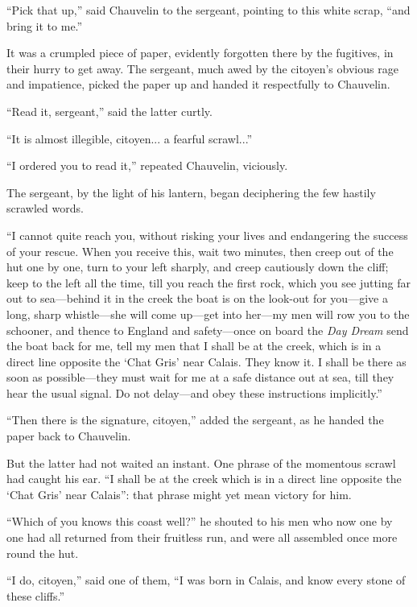 \documentclass[paper=5.5in:8.5in,BCOR=7mm,twoside,DIV=calc,12pt,usegeometry,chapterprefix,endperiod,headings=big]{scrbook}
\begin{document}
\enquote{Pick that up,} said Chauvelin to the sergeant, pointing to this white scrap, \enquote{and bring it to me.}

It was a crumpled piece of paper, evidently forgotten there by the fugitives, in their hurry to get away. The sergeant, much awed by the citoyen's obvious rage and impatience, picked the paper up and handed it respectfully to Chauvelin.

\enquote{Read it, sergeant,} said the latter curtly.

\enquote{It is almost illegible, citoyen... a fearful scrawl...}

\enquote{I ordered you to read it,} repeated Chauvelin, viciously.

The sergeant, by the light of his lantern, began deciphering the few hastily scrawled words.

\enquote{I cannot quite reach you, without risking your lives and endangering the success of your rescue. When you receive this, wait two minutes, then creep out of the hut one by one, turn to your left sharply, and creep cautiously down the cliff; keep to the left all the time, till you reach the first rock, which you see jutting far out to sea---behind it in the creek the boat is on the look-out for you---give a long, sharp whistle---she will come up---get into her---my men will row you to the schooner, and thence to England and safety---once on board the \textit{Day Dream} send the boat back for me, tell my men that I shall be at the creek, which is in a direct line opposite the \enquote{Chat Gris} near Calais. They know it. I shall be there as soon as possible---they must wait for me at a safe distance out at sea, till they hear the usual signal. Do not delay---and obey these instructions implicitly.}

\enquote{Then there is the signature, citoyen,} added the sergeant, as he handed the paper back to Chauvelin.

But the latter had not waited an instant. One phrase of the momentous scrawl had caught his ear. \enquote{I shall be at the creek which is in a direct line opposite the \enquote{Chat Gris} near Calais}: that phrase might yet mean victory for him.

\enquote{Which of you knows this coast well?} he shouted to his men who now one by one had all returned from their fruitless run, and were all assembled once more round the hut.

\enquote{I do, citoyen,} said one of them, \enquote{I was born in Calais, and know every stone of these cliffs.}
\end{document}
